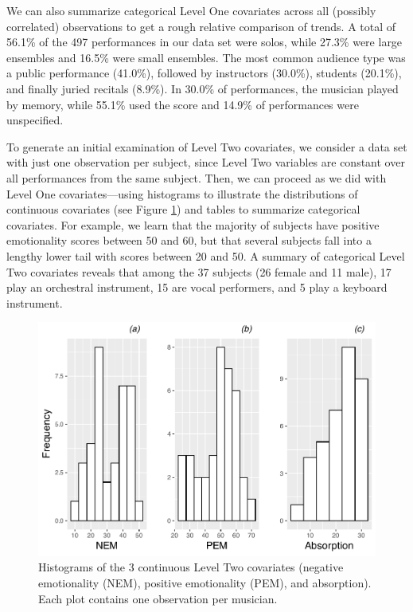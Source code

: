 \documentclass[
]{krantz}
\begin{document}
We can also summarize categorical Level One covariates across all (possibly correlated) observations to get a rough relative comparison of trends. A total of 56.1\% of the 497 performances in our data set were solos, while 27.3\% were large ensembles and 16.5\% were small ensembles. The most common audience type was a public performance (41.0\%), followed by instructors (30.0\%), students (20.1\%), and finally juried recitals (8.9\%). In 30.0\% of performances, the musician played by memory, while 55.1\% used the score and 14.9\% of performances were unspecified.

To generate an initial examination of Level Two covariates, we consider a data set with just one observation per subject, since Level Two variables are constant over all performances from the same subject. Then, we can proceed as we did with Level One covariates---using histograms to illustrate the distributions of continuous covariates (see Figure \ref{fig:mli-histmat1}) and tables to summarize categorical covariates. For example, we learn that the majority of subjects have positive emotionality scores between 50 and 60, but that several subjects fall into a lengthy lower tail with scores between 20 and 50. A summary of categorical Level Two covariates reveals that among the 37 subjects (26 female and 11 male), 17 play an orchestral instrument, 15 are vocal performers, and 5 play a keyboard instrument.

\begin{figure}

{\centering \includegraphics[width=0.6\linewidth]{bookdown-BeyondMLR_files/figure-latex/mli-histmat1-1} 

}

\caption{Histograms of the 3 continuous Level Two covariates (negative emotionality (NEM), positive emotionality (PEM), and absorption).  Each plot contains one observation per musician.}\label{fig:mli-histmat1}
\end{figure}
\end{document}
